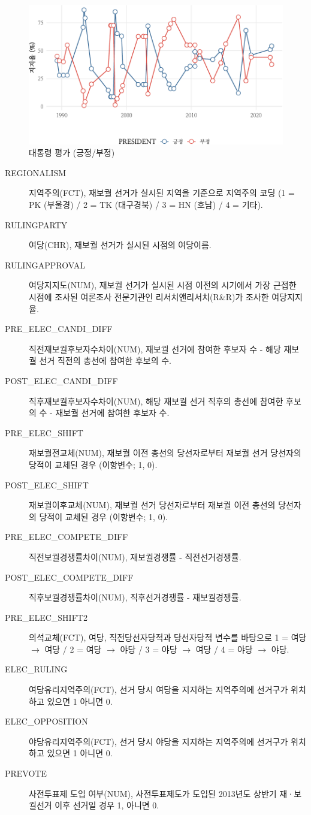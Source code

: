 \documentclass[
  11pt,
  letter]{article}
\begin{document}
\begin{figure}
\centering
\includegraphics{Codebook_national_files/figure-latex/unnamed-chunk-20-1.pdf}
\caption{대통령 평가 (긍정/부정)}
\end{figure}

\begin{description}
\item[REGIONALISM]
지역주의(FCT), 재보궐 선거가 실시된 지역을 기준으로 지역주의 코딩 (1 =
PK (부울경) / 2 = TK (대구경북) / 3 = HN (호남) / 4 = 기타).
\item[RULINGPARTY]
여당(CHR), 재보궐 선거가 실시된 시점의 여당이름.
\item[RULINGAPPROVAL]
여당지지도(NUM), 재보궐 선거가 실시된 시점 이전의 시기에서 가장 근접한
시점에 조사된 여론조사 전문기관인 리서치앤리서치(R\&R)가 조사한
여당지지율.
\item[PRE\_ELEC\_CANDI\_DIFF]
직전재보궐후보자수차이(NUM), 재보궐 선거에 참여한 후보자 수 - 해당
재보궐 선거 직전의 총선에 참여한 후보의 수.
\item[POST\_ELEC\_CANDI\_DIFF]
직후재보궐후보자수차이(NUM), 해당 재보궐 선거 직후의 총선에 참여한
후보의 수 - 재보궐 선거에 참여한 후보자 수.
\item[PRE\_ELEC\_SHIFT]
재보궐전교체(NUM), 재보궐 이전 총선의 당선자로부터 재보궐 선거 당선자의
당적이 교체된 경우 (이항변수; 1, 0).
\item[POST\_ELEC\_SHIFT]
재보궐이후교체(NUM), 재보궐 선거 당선자로부터 재보궐 이전 총선의
당선자의 당적이 교체된 경우 (이항변수; 1, 0).
\item[PRE\_ELEC\_COMPETE\_DIFF]
직전보궐경쟁률차이(NUM), 재보궐경쟁률 - 직전선거경쟁률.
\item[POST\_ELEC\_COMPETE\_DIFF]
직후보궐경쟁률차이(NUM), 직후선거경쟁률 - 재보궐경쟁률.
\item[PRE\_ELEC\_SHIFT2]
의석교체(FCT), 여당, 직전당선자당적과 당선자당적 변수를 바탕으로 1 =
여당 \(\rightarrow\) 여당 / 2 = 여당 \(\rightarrow\) 야당 / 3 = 야당
\(\rightarrow\) 여당 / 4 = 야당 \(\rightarrow\) 야당.
\item[ELEC\_RULING]
여당유리지역주의(FCT), 선거 당시 여당을 지지하는 지역주의에 선거구가
위치하고 있으면 1 아니면 0.
\item[ELEC\_OPPOSITION]
야당유리지역주의(FCT), 선거 당시 야당을 지지하는 지역주의에 선거구가
위치하고 있으면 1 아니면 0.
\item[PREVOTE]
사전투표제 도입 여부(NUM), 사전투표제도가 도입된 2013년도 상반기
재·보궐선거 이후 선거일 경우 1, 아니면 0.
\end{description}
\end{document}
